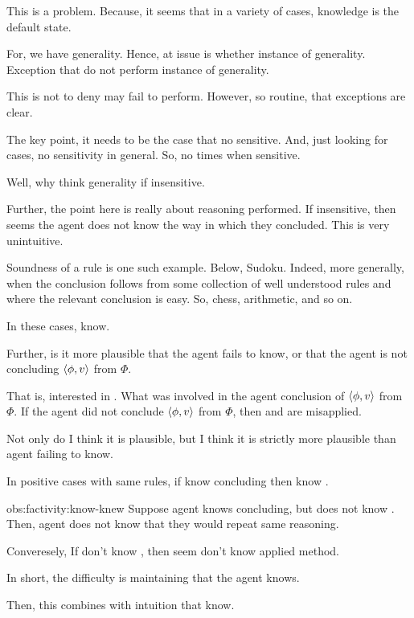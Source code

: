 \begin{note}
  This is a problem.
  Because, it seems that in a variety of cases, knowledge is the default state.

  For, we have generality.
  Hence, at issue is whether instance of generality.
  Exception that do not perform instance of generality.

  This is not to deny may fail to perform.
  However, so routine, that exceptions are clear.

  The key point, it needs to be the case that no sensitive.
  And, just looking for cases, no sensitivity in general.
  So, no times when sensitive.

  Well, why think generality if insensitive.
\end{note}

\begin{note}
  Further, the point here is really about reasoning performed.
  If insensitive, then seems the agent does not know the way in which they concluded.
  This is very unintuitive.

  Soundness of a rule is one such example.
  Below, Sudoku.
  Indeed, more generally, when the conclusion follows from some collection of well understood rules and where the relevant conclusion is easy.
  So, chess, arithmetic, and so on.

  In these cases, know.
\end{note}

\begin{note}
  Further, is it more plausible that the agent fails to know, or that the agent is not concluding \(\langle \phi, v \rangle\) from \(\Phi\).

  That is, interested in \qWhy{}.
  What was involved in the agent conclusion of \(\langle \phi, v \rangle\) from \(\Phi\).
  If the agent did not conclude \(\langle \phi, v \rangle\) from \(\Phi\), then \qWhy{} and \qWhyV{} are misapplied.

  Not only do I think it is plausible, but I think it is strictly more plausible than agent failing to know.
\end{note}

\begin{note}
  \begin{observation}
    \label{obs:factivity:know-knew}
    In positive cases with same rules, if know concluding then know \fc{}.
  \end{observation}
  \begin{argument}{obs:factivity:know-knew}
    Suppose agent knows concluding, but does not know \fc{}.
    Then, agent does not know that they would repeat same reasoning.

    Converesely, If don't know \fc{}, then seem don't know applied method.
  \end{argument}
  In short, the difficulty is maintaining that the agent knows.

  Then, this combines with intuition that know.
\end{note}

